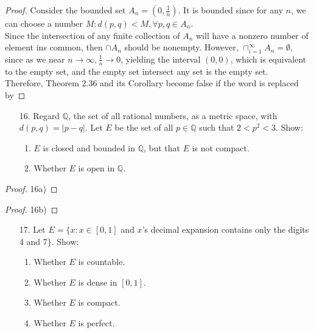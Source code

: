 \documentclass[10pt]{article}
\theoremstyle{definition}
\theoremstyle{plain}
\newcommand{\Q}{\mathbb{Q}}
\begin{document}
\begin{proof}
Consider the bounded set $A_n = (0, \frac{1}{n})$. It is bounded since for any $n$, we can choose a number $M: d(p,q) < M, \forall p,q\in A_n$. \\

Since the intersection of any finite collection of $A_n$ will have a nonzero number of element ins common, then $\cap A_n$ should be nonempty. However, $\cap_{i=1}^\infty A_n = \emptyset$, since as we near $n\rightarrow\infty, \frac{1}{n}\rightarrow 0$, yielding the interval $(0,0)$, which is equivalent to the empty set, and the empty set intersect any set is the empty set. \\

Therefore, Theorem 2.36 and its Corollary become false if the word  is replaced by 
\end{proof}




\pagebreak



\begin{enumerate}
\item[16.] Regard $\Q$, the set of all rational numbers, as a metric space, with $d(p,q)=|p-q|$. Let $E$ be the set of all $p\in \Q$ such that $2<p^2<3$. Show:
\begin{enumerate}
\item $E$ is closed and bounded in $\Q$, but that $E$ is not compact.
\item Whether $E$ is open in $\Q$.
\end{enumerate}
\end{enumerate}

\begin{proof}
16a)


\end{proof}

\begin{proof}
16b)
\end{proof}



\pagebreak



\begin{enumerate}
\item[17.] Let $E = \{x: x\in [0,1]$ and $x$'s decimal expansion contains only the digits 4 and 7$\}$. Show: 
\begin{enumerate}
\item Whether $E$ is countable.
\item Whether $E$ is dense in $[0,1]$.
\item Whether $E$ is compact.
\item Whether $E$ is perfect.
\end{enumerate}
\end{enumerate}
\end{document}
